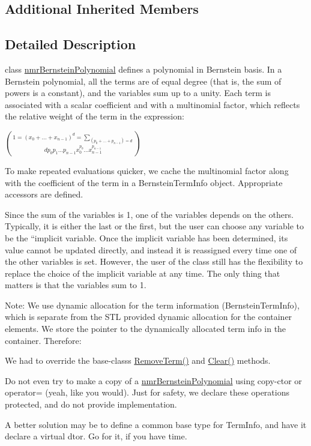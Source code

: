 \subsection*{Additional Inherited Members}


\subsection{Detailed Description}
class \hyperlink{classnmr_bernstein_polynomial}{nmr\+Bernstein\+Polynomial} defines a polynomial in Bernstein basis. In a Bernstein polynomial, all the terms are of equal degree (that is, the sum of powers is a constant), and the variables sum up to a unity. Each term is associated with a scalar coefficient and with a multinomial factor, which reflects the relative weight of the term in the expression\+:

$1 = (x_0 + ... + x_{n-1}) ^ d = \sum_{(p_0 + ... + p_{n-1}) = d} \choose{d}{p_0 p_1 ... p_{n-1}} x_0^{p_0} ... x_{n-1}^{p_{n-1}}$

To make repeated evaluations quicker, we cache the multinomial factor along with the coefficient of the term in a Bernstein\+Term\+Info object. Appropriate accessors are defined.

Since the sum of the variables is 1, one of the variables depends on the others. Typically, it is either the last or the first, but the user can choose any variable to be the ``implicit\textquotesingle{}\textquotesingle{} variable. Once the implicit variable has been determined, its value cannot be updated directly, and instead it is reassigned every time one of the other variables is set. However, the user of the class still has the flexibility to replace the choice of the implicit variable at any time. The only thing that matters is that the variables sum to 1.

Note\+: We use dynamic allocation for the term information (Bernstein\+Term\+Info), which is separate from the S\+T\+L provided dynamic allocation for the container elements. We store the pointer to the dynamically allocated term info in the container. Therefore\+:


\begin{DoxyEnumerate}
\item We had to override the base-\/class\textquotesingle{}s \hyperlink{classnmr_bernstein_polynomial_a615e825f6b2c453fa48bf50b387af9bb}{Remove\+Term()} and \hyperlink{classnmr_bernstein_polynomial_a7987a19a4cccb2dac54ffee7b77492fb}{Clear()} methods.
\item Do not even try to make a copy of a \hyperlink{classnmr_bernstein_polynomial}{nmr\+Bernstein\+Polynomial} using copy-\/ctor or operator= (yeah, like you would). Just for safety, we declare these operations protected, and do not provide implementation.
\item A better solution may be to define a common base type for Term\+Info, and have it declare a virtual dtor. Go for it, if you have time. 
\end{DoxyEnumerate}

